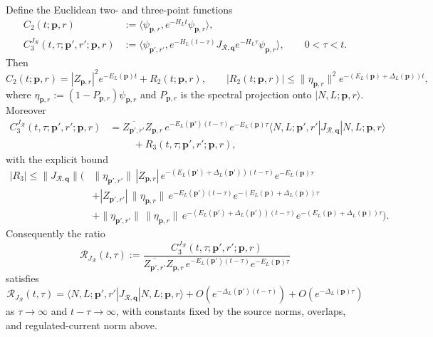 \begin{proposition}
Define the Euclidean two- and three-point functions
\begin{align}
  C_2(t;\mathbf p,r)
  &:=
  \langle\psi_{\mathbf p,r},e^{-H_Lt}\psi_{\mathbf p,r}\rangle,
  \label{eq:qcd-two-point-transfer-matrix-form}\\
  C_3^{J_{\mathcal R}}(t,\tau;\mathbf p',r';\mathbf p,r)
  &:=
  \langle
    \psi_{\mathbf p',r'},
    e^{-H_L(t-\tau)}J_{\mathcal R,\mathbf q}e^{-H_L\tau}
    \psi_{\mathbf p,r}
  \rangle,
  \qquad 0<\tau<t .
  \label{eq:qcd-three-point-transfer-matrix-form}
\end{align}
Then
\begin{equation}
  C_2(t;\mathbf p,r)
  =
  |Z_{\mathbf p,r}|^2e^{-E_L(\mathbf p)t}
  +R_2(t;\mathbf p,r),
  \qquad
  |R_2(t;\mathbf p,r)|
  \le
  \|\eta_{\mathbf p,r}\|^2
  e^{-(E_L(\mathbf p)+\Delta_L(\mathbf p))t},
  \label{eq:qcd-two-point-gap-estimate}
\end{equation}
where
\(\eta_{\mathbf p,r}:=(1-P_{\mathbf p,r})\psi_{\mathbf p,r}\) and
\(P_{\mathbf p,r}\) is the spectral projection onto
\(|N,L;\mathbf p,r\rangle\).  Moreover
\begin{align}
  C_3^{J_{\mathcal R}}(t,\tau;\mathbf p',r';\mathbf p,r)
  &=
  \overline{Z_{\mathbf p',r'}}Z_{\mathbf p,r}\,
  e^{-E_L(\mathbf p')(t-\tau)}e^{-E_L(\mathbf p)\tau}
  \langle N,L;\mathbf p',r'|
    J_{\mathcal R,\mathbf q}
  |N,L;\mathbf p,r\rangle
  \nonumber\\
  &\hspace{1cm}
  +R_3(t,\tau;\mathbf p',r';\mathbf p,r),
  \label{eq:qcd-three-point-gap-expansion}
\end{align}
with the explicit bound
\begin{align}
  |R_3|
  \le
  \|J_{\mathcal R,\mathbf q}\|
  \Big(&
    \|\eta_{\mathbf p',r'}\|\,|Z_{\mathbf p,r}|\,
    e^{-(E_L(\mathbf p')+\Delta_L(\mathbf p'))(t-\tau)}
    e^{-E_L(\mathbf p)\tau}
  \nonumber\\
  &+
    |Z_{\mathbf p',r'}|\,\|\eta_{\mathbf p,r}\|\,
    e^{-E_L(\mathbf p')(t-\tau)}
    e^{-(E_L(\mathbf p)+\Delta_L(\mathbf p))\tau}
  \nonumber\\
  &+
    \|\eta_{\mathbf p',r'}\|\,\|\eta_{\mathbf p,r}\|\,
    e^{-(E_L(\mathbf p')+\Delta_L(\mathbf p'))(t-\tau)}
    e^{-(E_L(\mathbf p)+\Delta_L(\mathbf p))\tau}
  \Big).
  \label{eq:qcd-three-point-gap-bound}
\end{align}
Consequently the ratio
\begin{equation}
  \mathcal R_{J_{\mathcal R}}(t,\tau)
  :=
  \frac{
    C_3^{J_{\mathcal R}}(t,\tau;\mathbf p',r';\mathbf p,r)}
  {
    \overline{Z_{\mathbf p',r'}}Z_{\mathbf p,r}\,
    e^{-E_L(\mathbf p')(t-\tau)}e^{-E_L(\mathbf p)\tau}}
  \label{eq:qcd-three-point-matrix-element-ratio}
\end{equation}
satisfies
\[
  \mathcal R_{J_{\mathcal R}}(t,\tau)
  =
  \langle N,L;\mathbf p',r'|
    J_{\mathcal R,\mathbf q}
  |N,L;\mathbf p,r\rangle
  +O(e^{-\Delta_L(\mathbf p')(t-\tau)})
  +O(e^{-\Delta_L(\mathbf p)\tau})
\]
as \(\tau\to\infty\) and \(t-\tau\to\infty\), with constants fixed by the
source norms, overlaps, and regulated-current norm above.
\end{proposition}

